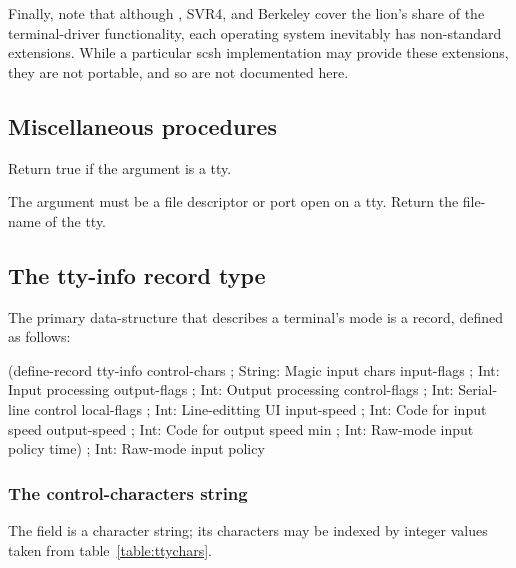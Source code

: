 Finally, note that although {\Posix}, SVR4, and Berkeley cover the lion's
share of the terminal-driver functionality, 
each operating system inevitably has non-standard extensions.
While a particular scsh implementation may provide these extensions,
they are not portable, and so are not documented here.

\subsection{Miscellaneous procedures}
\begin{desc}
Return true if the argument is a tty.
\end{desc}

\begin{desc}
The argument  must be a file descriptor or port open on a tty.
Return the file-name of the tty.
\end{desc}

\subsection{The tty-info record type}

The primary data-structure that describes a terminal's mode is
a  record, defined as follows:
\begin{code}
(define-record tty-info
  control-chars  ; String: Magic input chars
  input-flags    ; Int: Input processing
  output-flags   ; Int: Output processing
  control-flags  ; Int: Serial-line control
  local-flags    ; Int: Line-editting UI
  input-speed    ; Int: Code for input speed
  output-speed   ; Int: Code for output speed
  min            ; Int: Raw-mode input policy
  time)          ; Int: Raw-mode input policy\end{code}

\subsubsection{The control-characters string}
The  field is a character string;
its characters may be indexed by integer values taken from 
table~\ref{table:ttychars}.

